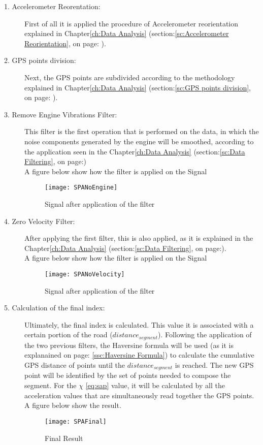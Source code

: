 \documentclass[tesi]{subfiles}
\begin{document}
\begin{description}
\item[1. Accelerometer Reorentation:] First of all it is applied the procedure of Accelerometer reorientation explained in Chapter\ref{ch:Data Analysis} (section:\ref{sc:Accelerometer Reorientation}, on page: \pageref{sc:Accelerometer Reorientation}).
\item[2. GPS points division:] Next, the GPS points are subdivided according to the methodology explained in Chapter\ref{ch:Data Analysis} (section:\ref{sc:GPS points division}, on page: \pageref{sc:GPS points division}).
\item[3. Remove Engine Vibrations Filter:] This filter is the first operation that is performed on the data, in which the noise components generated by the engine will be smoothed, according to the application seen in the Chapter\ref{ch:Data Analysis} (section:\ref{sc:Data Filtering}, on page:\pageref{sssc:Remove Engine Vibrations Filter})\\
A figure below show how the filter is applied on the Signal
\begin{figure}[H]
\centering
\texttt{[image: SPANoEngine]}
\caption{Signal after application of the filter}
\end{figure}
\item[4. Zero Velocity Filter:] After applying the first filter, this is also applied, as it is explained in the Chapter\ref{ch:Data Analysis} (section:\ref{sc:Data Filtering}, on page:\pageref{sssc:Zero Velocity Filter}).\\
A figure below show how the filter is applied on the Signal
\begin{figure}[H]
\centering
\texttt{[image: SPANoVelocity]}
\caption{Signal after application of the filter}
\end{figure}
\item[5. Calculation of the final index:] Ultimately, the final index is calculated. 
This value it is associated with a certain portion of the road ($distance_{segment}$). Following the application of the two previous filters, the Haversine formula will be used (as it is explanained on page: \ref{ssc:Haversine Formula}) to calculate the cumulative GPS distance of points until the $distance_{segment}$ is reached. The new GPS point will be identified by the set of points needed to compose the segment. For the $\chi$ \thinspace \ref{eq:sap} value, it will be calculated by all the acceleration values that are simultaneously read together the GPS points.\\
A figure below show the result.
\begin{figure}[H]
\centering
\texttt{[image: SPAFinal]}
\caption{Final Result}
\end{figure}\label{fig:Simple Accelerations Points Final Result}
\end{description}
\end{document}
